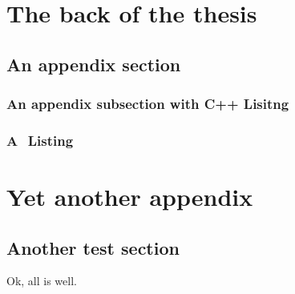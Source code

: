 \documentclass[a4paper,11pt]{mscThesis}
\begin{document}
\appendix

    \chapter{The back of the thesis}

    \section{An appendix section}

    \subsection{An appendix subsection with C++ Lisitng}

    \lstset{language=C++}
    

    \subsection{A \matlab $ $ Listing}

    \lstset{language=matlab}
    

    \chapter{Yet another appendix}

    \section{Another test section}

    Ok, all is well.

    \printindex%
    \cleardoublepage%
\end{document}
